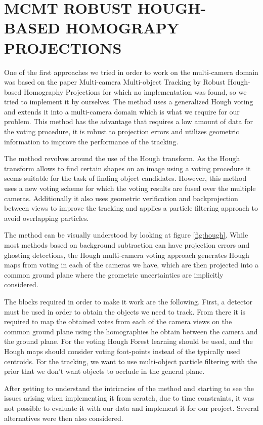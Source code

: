 \documentclass[journal, a4paper]{IEEEtran}
\begin{document}
\section{MCMT ROBUST HOUGH-BASED HOMOGRAPY PROJECTIONS}
\label{sec:MTM_Hough_Homog}
One of the first approaches we tried in order to work on the multi-camera domain was based on the paper Multi-camera Multi-object Tracking by Robust Hough-based Homography Projections \cite{sternig2011multi} for which no implementation was found, so we tried to implement it by ourselves. The method uses a generalized Hough voting and extends it into a multi-camera domain which is what we require for our problem. This method has the advantage that requires a low amount of data for the voting procedure, it is robust to projection errors and utilizes geometric information to improve the performance of the tracking.

The method revolves around the use of the Hough transform. As the Hough transform allows to find certain shapes on an image using a voting procedure it seems suitable for the task of finding object candidates. However, this method uses a new voting scheme for which the voting results are fused over the multiple cameras. Additionally it also uses geometric verification and backprojection between views to improve the tracking and applies a particle filtering approach to avoid overlapping particles.  

The method can be visually understood by looking at figure \ref{fig:hough}. While most methods based on background subtraction can have projection errors and ghosting detections, the Hough multi-camera voting approach generates Hough maps from voting in each of the cameras we have, which are then projected into a common ground plane where the geometric uncertainties are implicitly considered.

The blocks required in order to make it work are the following. First, a detector must be used in order to obtain the objects we need to track. From there it is required to map the obtained votes from each of the camera views on the common ground plane using the homographies he obtain between the camera and the ground plane. For the voting Hough Forest learning should be used, and the Hough maps should consider voting foot-points instead of the typically used centroids. For the tracking, we want to use multi-object particle filtering with the prior that we don't want objects to occlude in the general plane.

After getting to understand the intricacies of the method and starting to see the issues arising when implementing it from scratch, due to time constraints, it was not possible to evaluate it with our data and implement it for our project. Several alternatives were then also considered.
\end{document}
